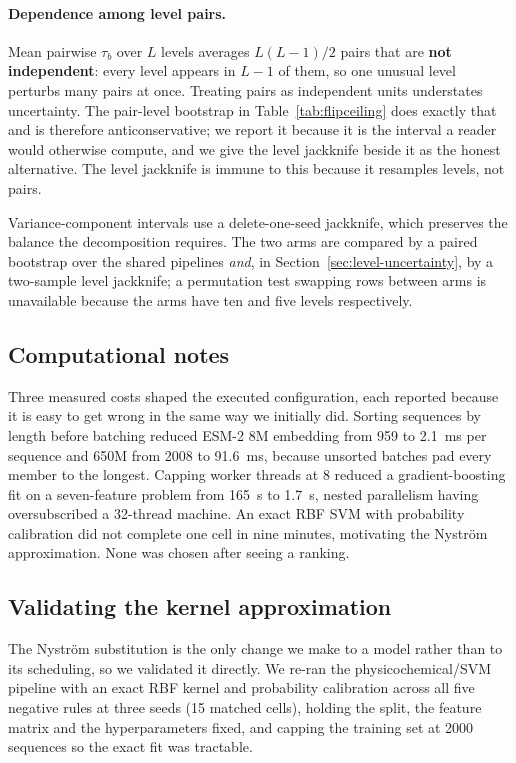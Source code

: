 \documentclass[11pt,a4paper]{article}
\begin{document}
\paragraph{Dependence among level pairs.} Mean pairwise $\tau_b$ over $L$ levels averages
$L(L-1)/2$ pairs that are \textbf{not independent}: every level appears in $L-1$ of them, so
one unusual level perturbs many pairs at once. Treating pairs as independent units
understates uncertainty. The pair-level bootstrap in Table~\ref{tab:flipceiling} does
exactly that and is therefore anticonservative; we report it because it is the interval a
reader would otherwise compute, and we give the level jackknife beside it as the honest
alternative. The level jackknife is immune to this because it resamples levels, not pairs.

Variance-component intervals use a delete-one-seed jackknife, which preserves the balance
the decomposition requires. The two arms are compared by a paired bootstrap over the shared
pipelines \emph{and}, in Section~\ref{sec:level-uncertainty}, by a two-sample level
jackknife; a permutation test swapping rows between arms is unavailable because the arms
have ten and five levels respectively.

\subsection{Computational notes}

Three measured costs shaped the executed configuration, each reported because it is easy to
get wrong in the same way we initially did. Sorting sequences by length before batching
reduced ESM-2 8M embedding from 959 to \SI{2.1}{\milli\second} per sequence and 650M from
2008 to \SI{91.6}{\milli\second}, because unsorted batches pad every member to the longest.
Capping worker threads at 8 reduced a gradient-boosting fit on a seven-feature problem from
\SI{165}{\second} to \SI{1.7}{\second}, nested parallelism having oversubscribed a
32-thread machine. An exact RBF SVM with probability calibration did not complete one cell
in nine minutes, motivating the Nystr\"om approximation. None was chosen after seeing a
ranking.

\subsection{Validating the kernel approximation}
\label{sec:svm-validation}

The Nystr\"om substitution is the only change we make to a model rather than to its
scheduling, so we validated it directly. We re-ran the physicochemical/SVM pipeline with an
exact RBF kernel and probability calibration across all five negative rules at three seeds
(15 matched cells), holding the split, the feature matrix and the hyperparameters fixed, and
capping the training set at 2000 sequences so the exact fit was tractable.
\end{document}
